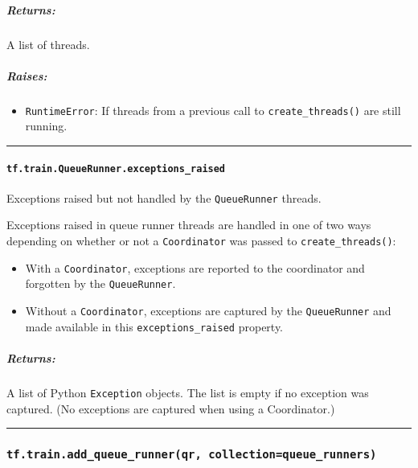 \subparagraph{Returns: }\label{returns-18}

A list of threads.

\subparagraph{Raises: }\label{raises-11}

\begin{itemize}
\tightlist
\item
  \texttt{RuntimeError}: If threads from a previous call to
  \texttt{create\_threads()} are still running.
\end{itemize}

\begin{center}\rule{0.5\linewidth}{\linethickness}\end{center}

\paragraph{\texorpdfstring{\texttt{tf.train.QueueRunner.exceptions\_raised}
}{tf.train.QueueRunner.exceptions\_raised }}\label{tf.train.queuerunner.exceptionsux5fraised}

Exceptions raised but not handled by the \texttt{QueueRunner} threads.

Exceptions raised in queue runner threads are handled in one of two ways
depending on whether or not a \texttt{Coordinator} was passed to
\texttt{create\_threads()}:

\begin{itemize}
\tightlist
\item
  With a \texttt{Coordinator}, exceptions are reported to the
  coordinator and forgotten by the \texttt{QueueRunner}.
\item
  Without a \texttt{Coordinator}, exceptions are captured by the
  \texttt{QueueRunner} and made available in this
  \texttt{exceptions\_raised} property.
\end{itemize}

\subparagraph{Returns: }\label{returns-19}

A list of Python \texttt{Exception} objects. The list is empty if no
exception was captured. (No exceptions are captured when using a
Coordinator.)

\begin{center}\rule{0.5\linewidth}{\linethickness}\end{center}

\subsubsection{\texorpdfstring{\texttt{tf.train.add\_queue\_runner(qr,\ collection=\textquotesingle{}queue\_runners\textquotesingle{})}
}{tf.train.add\_queue\_runner(qr, collection='queue\_runners') }}\label{tf.train.addux5fqueueux5frunnerqr-collectionqueueux5frunners}

